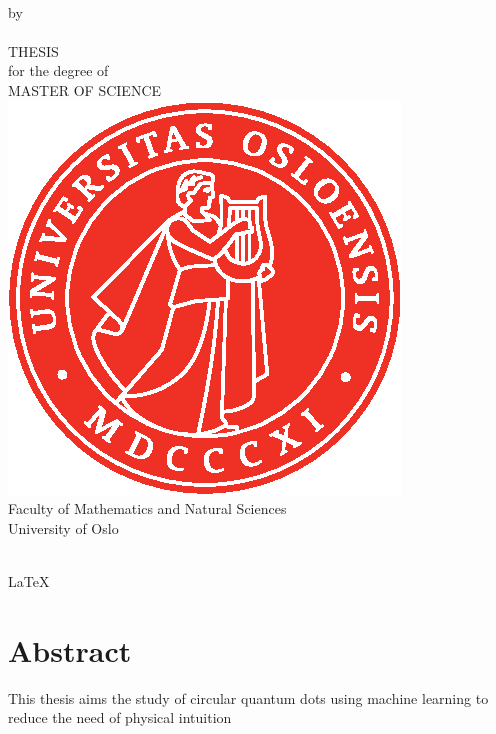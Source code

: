 \thispagestyle{empty}
\begin{center} \vspace{1cm}
    \textbf{\Large{\mtitle}}\\ \vspace{0.5cm}
    \small{by}\\ \vspace{0.5cm}
    \large{\mauthor}\\ \vspace{4.4cm}
    \large{THESIS}\\ \vspace{0.3cm}
    \small{for the degree of}\\ \vspace{0.3cm}
    \large{MASTER OF SCIENCE}\\ \vspace{0.7cm}
    \includegraphics[scale=1.0]{Images/UiO_Segl_pms485.eps} \\ \vspace{0.5cm}
    \large{Faculty of Mathematics and Natural Sciences \\ University of Oslo} \\ \vspace{0.5cm}
    \small{\mdate}\\ \vfill
\end{center}
\newpage
\clearpage
\LaTeX
\newpage
\section*{Abstract}
This thesis aims the study of circular quantum dots using machine learning to reduce the need of physical intuition

